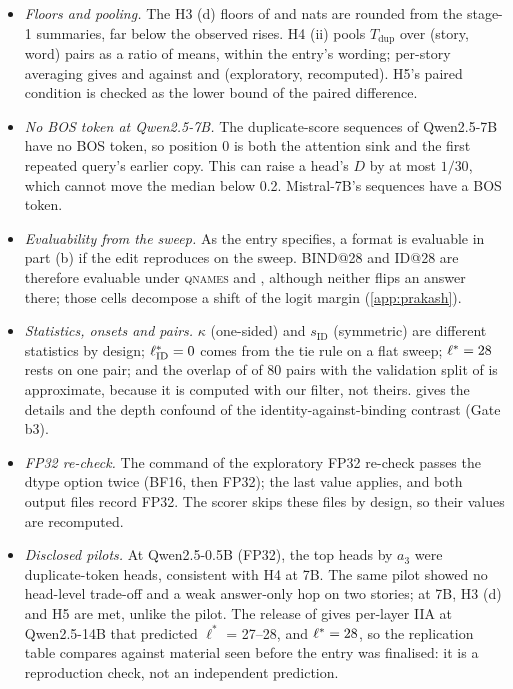 \begin{itemize}
  \item \emph{Floors and pooling.} The H3 (d) floors of \HthreeFloorQwenSeven{} and \HthreeFloorMistralSeven{} nats are rounded from the stage-1 summaries, far below the observed rises. H4 (ii) pools $T_{\mathrm{dup}}$ over (story, word) pairs as a ratio of means, within the entry's wording; per-story averaging gives \HfourTstoryQwenSeven{} and \HfourTstoryMistralSeven{} against \HfourTQwenSeven{} and \HfourTMistralSeven{} (exploratory, recomputed). H5's paired condition is checked as the lower bound of the paired difference.
  \item \emph{No BOS token at Qwen2.5-7B.} The duplicate-score sequences of Qwen2.5-7B have no BOS token, so position 0 is both the attention sink and the first repeated query's earlier copy. This can raise a head's $D$ by at most $1/30$, which cannot move the median below 0.2. Mistral-7B's sequences have a BOS token.
  \item \emph{Evaluability from the \textup{\fmtNone{}} sweep.} As the entry specifies, a format is evaluable in part (b) if the edit reproduces on the \fmtNone{} sweep. BIND@28 and ID@28 are therefore evaluable under \textsc{qnames} and \fmtOpt{}, although neither flips an answer there; those cells decompose a shift of the logit margin (\cref{app:prakash}).
  \item \emph{Statistics, onsets and pairs.} $\kappa$ (one-sided) and $s_{\mathrm{ID}}$ (symmetric) are different statistics by design; $\ell^*_{\mathrm{ID}} = 0{}$ comes from the tie rule on a flat sweep; $\ell^* = 28{}$ rests on one pair; and the overlap of \PkOverlap{} of 80 pairs with the validation split of \citet{prakash2025lookbacks} is approximate, because it is computed with our filter, not theirs.  gives the details and the depth confound of the identity-against-binding contrast (Gate b3).
  \item \emph{FP32 re-check.} The command of the exploratory FP32 re-check passes the dtype option twice (BF16, then FP32); the last value applies, and both output files record FP32. The scorer skips these files by design, so their values are recomputed.
  \item \emph{Disclosed pilots.} At Qwen2.5-0.5B (FP32), the top heads by $a_3$ were duplicate-token heads, consistent with H4 at 7B. The same pilot showed no head-level trade-off and a weak answer-only hop on two stories; at 7B, H3 (d) and H5 are met, unlike the pilot. The release of \citet{prakash2025lookbacks} gives per-layer IIA at Qwen2.5-14B that predicted $\ell^*$ = 27--28, and $\ell^* = 28{}$, so the replication table compares against material seen before the entry was finalised: it is a reproduction check, not an independent prediction.

\end{itemize}
